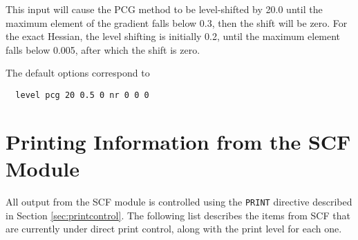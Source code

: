 This input will cause the PCG method to be level-shifted by 20.0 until
the maximum element of the gradient falls below 0.3, then the shift
will be zero.  For the exact Hessian, the level shifting is initially
0.2, until the maximum element falls below 0.005, after which the
shift is zero. 

The default options correspond to
\begin{verbatim}
  level pcg 20 0.5 0 nr 0 0 0
\end{verbatim}


\section{Printing Information from the SCF Module}
\label{sec:scfprint}

All output from the SCF module is controlled using the \verb+PRINT+
directive described in Section \ref{sec:printcontrol}.  The following 
list describes the items from SCF that are currently under direct 
print control, along with the print level for each one.

